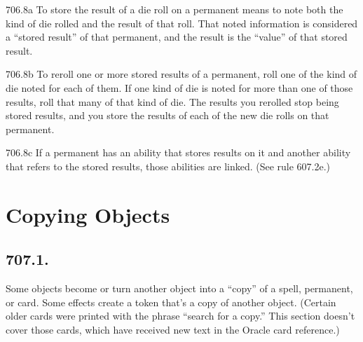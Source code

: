 706.8a To store the result of a die roll on a permanent means to note both the kind of die rolled and the result of that roll. That noted information is considered a “stored result” of that permanent, and the result is the “value” of that stored result.

706.8b To reroll one or more stored results of a permanent, roll one of the kind of die noted for each of them. If one kind of die is noted for more than one of those results, roll that many of that kind of die. The results you rerolled stop being stored results, and you store the results of each of the new die rolls on that permanent.

706.8c If a permanent has an ability that stores results on it and another ability that refers to the stored results, those abilities are linked. (See rule 607.2e.)

\section{Copying Objects}
\subsection*{707.1.}
Some objects become or turn another object into a “copy” of a spell, permanent, or card. Some effects create a token that’s a copy of another object. (Certain older cards were printed with the phrase “search for a copy.” This section doesn’t cover those cards, which have received new text in the Oracle card reference.)

